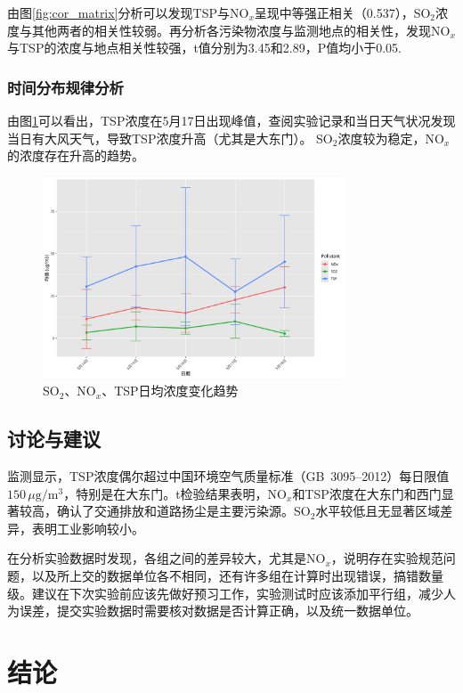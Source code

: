 \documentclass[12pt,hyperref,a4paper,UTF8]{ctexart}
\begin{document}
由图\ref{fig:cor_matrix}分析可以发现TSP与NO$_x$呈现中等强正相关（0.537），SO$_2$浓度与其他两者的相关性较弱。再分析各污染物浓度与监测地点的相关性，发现NO$_x$与TSP的浓度与地点相关性较强，t值分别为3.45和2.89，P值均小于0.05.



\subsubsection{时间分布规律分析}
由图\ref{fig:daily_mean_trend}可以看出，TSP浓度在5月17日出现峰值，查阅实验记录和当日天气状况发现当日有大风天气，导致TSP浓度升高（尤其是大东门）。
SO$_2$浓度较为稳定，NO$_x$的浓度存在升高的趋势。

\begin{figure}[htbp]
    \centering
    \includegraphics[width=0.8\textwidth]{dataout/daily_mean_trend.png}
    \caption{SO$_2$、NO$_x$、TSP日均浓度变化趋势}
    \label{fig:daily_mean_trend}
\end{figure}
\subsection{讨论与建议}
监测显示，TSP浓度偶尔超过中国环境空气质量标准（GB~3095--2012）每日限值$150\,\mu\mathrm{g}/\mathrm{m}^3$，特别是在大东门。t检验结果表明，NO$_x$和TSP浓度在大东门和西门显著较高，确认了交通排放和道路扬尘是主要污染源。SO$_2$水平较低且无显著区域差异，表明工业影响较小。

在分析实验数据时发现，各组之间的差异较大，尤其是NO$_x$，说明存在实验规范问题，以及所上交的数据单位各不相同，还有许多组在计算时出现错误，搞错数量级。建议在下次实验前应该先做好预习工作，实验测试时应该添加平行组，减少人为误差，提交实验数据时需要核对数据是否计算正确，以及统一数据单位。

\section{结论}
\end{document}
